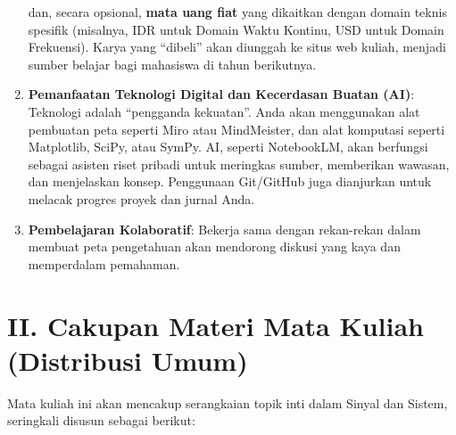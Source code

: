 \documentclass[
  letterpaper,
  DIV=11,
  numbers=noendperiod]{scrreprt}
\begin{document}
\begin{enumerate}
  dan, secara opsional, \textbf{mata uang fiat} yang dikaitkan dengan
  domain teknis spesifik (misalnya, IDR untuk Domain Waktu Kontinu, USD
  untuk Domain Frekuensi). Karya yang ``dibeli'' akan diunggah ke situs
  web kuliah, menjadi sumber belajar bagi mahasiswa di tahun berikutnya.
\item
  \textbf{Pemanfaatan Teknologi Digital dan Kecerdasan Buatan (AI)}:
  Teknologi adalah ``pengganda kekuatan''. Anda akan menggunakan alat
  pembuatan peta seperti Miro atau MindMeister, dan alat komputasi
  seperti Matplotlib, SciPy, atau SymPy. AI, seperti NotebookLM, akan
  berfungsi sebagai asisten riset pribadi untuk meringkas sumber,
  memberikan wawasan, dan menjelaskan konsep. Penggunaan Git/GitHub juga
  dianjurkan untuk melacak progres proyek dan jurnal Anda.
\item
  \textbf{Pembelajaran Kolaboratif}: Bekerja sama dengan rekan-rekan
  dalam membuat peta pengetahuan akan mendorong diskusi yang kaya dan
  memperdalam pemahaman.
\end{enumerate}

\section*{\texorpdfstring{\textbf{II. Cakupan Materi Mata Kuliah
(Distribusi
Umum)}}{II. Cakupan Materi Mata Kuliah (Distribusi Umum)}}\label{ii.-cakupan-materi-mata-kuliah-distribusi-umum}


Mata kuliah ini akan mencakup serangkaian topik inti dalam Sinyal dan
Sistem, seringkali disusun sebagai berikut:
\end{document}
